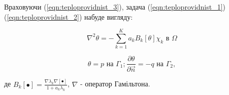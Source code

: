 Враховуючи (\ref{eqn:teploprovidnist_3}), задача (\ref{eqn:teploprovidnist_1})(\ref{eqn:teploprovidnist_2}) набуде вигляду:

\begin{equation}
\label{eqn:teploprovidnist_4}
\nabla^{2} \theta = -\sum_{k=1}^{K}a_k B_k[\theta]\chi_k \text{ в } \Omega
\end{equation}

\begin{equation}
\label{eqn:teploprovidnist_5}
\theta = p \text{ на } \Gamma_1; \frac{\partial\theta}{\partial \overrightarrow{n}} = -q \text{ на } \Gamma_2,
\end{equation}

де $B_k[\bullet]=\frac{\nabla\lambda_k\nabla[\bullet]}{1+a_k\lambda_k}$, $\nabla$ - оператор Гамільтона.







